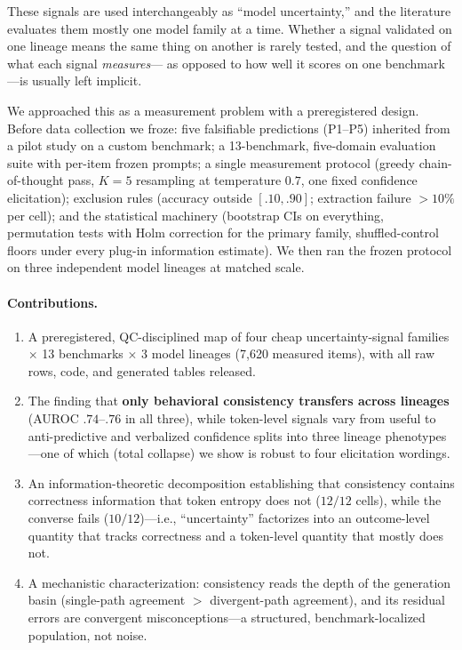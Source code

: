 \documentclass[10pt]{article}
\begin{document}
These signals are used interchangeably as ``model uncertainty,'' and the literature evaluates
them mostly one model family at a time. Whether a signal validated on one lineage means the
same thing on another is rarely tested, and the question of what each signal \emph{measures}---
as opposed to how well it scores on one benchmark---is usually left implicit.

We approached this as a measurement problem with a preregistered design. Before data collection
we froze: five falsifiable predictions (P1--P5) inherited from a pilot study on a custom
benchmark; a 13-benchmark, five-domain evaluation suite with per-item frozen prompts; a single
measurement protocol (greedy chain-of-thought pass, $K{=}5$ resampling at temperature $0.7$,
one fixed confidence elicitation); exclusion rules (accuracy outside $[.10,.90]$; extraction
failure ${>}10\%$ per cell); and the statistical machinery (bootstrap CIs on everything,
permutation tests with Holm correction for the primary family, shuffled-control floors under
every plug-in information estimate). We then ran the frozen protocol on three independent model
lineages at matched scale.

\paragraph{Contributions.}
\begin{enumerate}\itemsep2pt
\item A preregistered, QC-disciplined map of four cheap uncertainty-signal families $\times$ 13
benchmarks $\times$ 3 model lineages (7{,}620 measured items), with all raw rows, code, and
generated tables released.
\item The finding that \textbf{only behavioral consistency transfers across lineages}
(AUROC $.74$--$.76$ in all three), while token-level signals vary from useful to
anti-predictive and verbalized confidence splits into three lineage phenotypes---one of which
(total collapse) we show is robust to four elicitation wordings.
\item An information-theoretic decomposition establishing that consistency contains
correctness information that token entropy does not ($12/12$ cells), while the converse fails
($10/12$)---i.e., ``uncertainty'' factorizes into an outcome-level quantity that tracks
correctness and a token-level quantity that mostly does not.
\item A mechanistic characterization: consistency reads the depth of the generation basin
(single-path agreement $>$ divergent-path agreement), and its residual errors are convergent
misconceptions---a structured, benchmark-localized population, not noise.
\end{enumerate}
\end{document}
